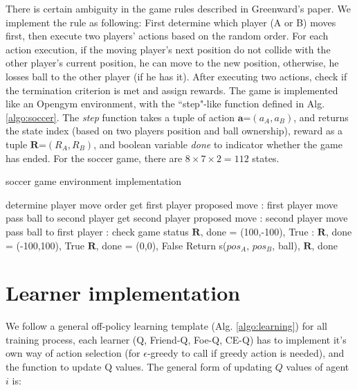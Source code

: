 \documentclass[conference]{IEEEtran}
\begin{document}
There is certain ambiguity in the game rules described in Greenward's paper\cite{greenwald2003correlated}. We implement the rule as following: First determine which player (A or B) moves first, then execute two players' actions based on the random order. For each action execution, if the moving player's next position do not collide with the other player's current position, he can move to the new position, otherwise, he losses ball to the other player (if he has it). After executing two actions, check if the termination criterion is met and assign rewards. The game is implemented like an Opengym environment, with the ``step"-like function defined in Alg.\ref{algo:soccer}. The \textit{step} function takes a tuple of action $\mathbf{a}$=$(a_A,a_B)$, and returns the state index (based on two players position and ball ownership), reward as a tuple $\mathbf{R}$=$(R_A,R_B)$, and boolean variable \textit{done} to indicator whether the game has ended. For the soccer game, there are $8\times7\times2=112$ states.

\begin{algorithm}[h!]
	\caption{soccer game environment implementation}
	\begin{algorithmic}
		\State determine player move order
		\State get first player proposed move
		:
			\State first player move
			\State pass ball to second player
		\EndIf
		\State get second player proposed move
		:
		\State second player move
		\State pass ball to first player
		\EndIf
		: 		\Comment check game status
			\State $\mathbf{R}$, done = (100,-100), True
		:
			\State $\mathbf{R}$, done = (-100,100), True
		\Else
			\State $\mathbf{R}$, done = (0,0), False
		\EndIf
		\State Return s($pos_A$, $pos_B$, ball), $\mathbf{R}$, done
		\EndFunction
	\end{algorithmic}
	\label{algo:soccer}
\end{algorithm}

\section{Learner implementation}
We follow a general off-policy learning template (Alg. \ref{algo:learning}) for all training process, each learner (Q, Friend-Q, Foe-Q, CE-Q) has to implement it's own way of action selection (for $\epsilon$-greedy to call if greedy action is needed), and the function to update Q values. The general form of updating $Q$ values of agent $i$ is:
\end{document}

